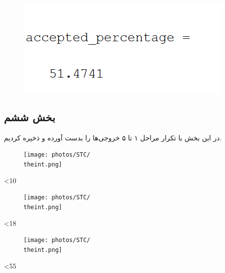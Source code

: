 \documentclass[12pt,onecolumn,a4paper,fleqn]{article}
\begin{document}
\begin{latin}
	\begin{figure}[ht]
			\includegraphics[width=0.35\linewidth]{photos/4_5.png}
	\end{figure}
\end{latin}

\subsection{بخش ششم}
در این بخش با تکرار مراحل ۱ تا ۵ خروجی‌ها را بدست آورده و ذخیره کردیم.

\setcounter{int}{1}
\loop

\begin{figure}[ht]
	\centering
	\texttt{[image: photos/STC/\\theint.png]}
\end{figure}

\addtocounter{int}{1}\ifnum\value{int}<10
\repeat


\loop

\begin{figure}[ht]
	\centering
	\texttt{[image: photos/STC/\\theint.png]}
\end{figure}


\addtocounter{int}{1}\ifnum\value{int}<18
\repeat

\clearpage

\loop

\begin{figure}[ht]
	\centering
	\texttt{[image: photos/STC/\\theint.png]}
\end{figure}	     


\addtocounter{int}{1}\ifnum\value{int}<55
\repeat 

\clearpage
\end{document}

